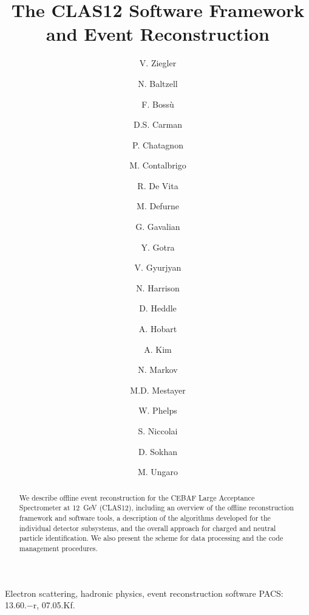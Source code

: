 \documentclass[3p,times,twocolumn]{elsarticle}
\begin{document}
\begin{frontmatter}

\title{The CLAS12 Software Framework and Event Reconstruction}

\author[JLab]{V. Ziegler }
\author[JLab]{N. Baltzell}
\author[Saclay]{F. Boss\`u}
\author[JLab]{D.S. Carman}
\author[IPNO]{P. Chatagnon}
\author[INFN]{M. Contalbrigo}
\author[INFN]{R. De Vita}
\author[Saclay]{M. Defurne}
\author[JLab]{G. Gavalian}
\author[JLab]{Y. Gotra}
\author[JLab]{V. Gyurjyan}
\author[JLab]{N. Harrison}
\author[CNU]{D. Heddle}
\author[IPNO]{A. Hobart}
\author[UConn]{A. Kim}
\author[JLab]{N. Markov}
\author[JLab]{M.D. Mestayer}
\author[CNU]{W. Phelps}
\author[IPNO]{S. Niccolai}
\author[Glasgow]{D. Sokhan}
\author[JLab]{M. Ungaro}

\address[JLab]{Thomas Jefferson National Accelerator Facility, Newport News, VA 23606, USA}
\address[CNU]{Christopher Newport University, 1 Avenue of the Arts, Newport News, 23606 VA , USA}
\address[UConn]{University of Connecticut, Storrs, CT 06269, USA}
\address[INFN]{INFN, Sezione di Genova, 16146 Genova, Italy}
\address[Saclay]{CEA-Saclay, Univ. Paris-Sud, Universit\'e Paris-Saclay, Gif-sur-Yvettes, France}
\address[IPNO]{Institut de Physique Nucl\'eaire, CNRS-IN2P3, Univ. Paris-Sud, Universit\'e Paris-Saclay,
91406 Orsay Cedex, France}
\address[Glasgow]{University of Glasgow, Glasgow G12 8QQ, United Kingdom}



\begin{abstract}
  We describe offline event reconstruction for the CEBAF Large Acceptance Spectrometer at 12~GeV (CLAS12),
  including an overview of the offline reconstruction framework and software tools, a description of the algorithms
  developed for the individual detector subsystems, and the overall approach for charged and neutral particle
  identification. We also present the scheme for data processing and the code management procedures.
\end{abstract}

\begin{keyword}
Electron scattering, hadronic physics, event reconstruction software PACS: 13.60.−r, 07.05.Kf.
\end{keyword}

\end{frontmatter}
\end{document}
